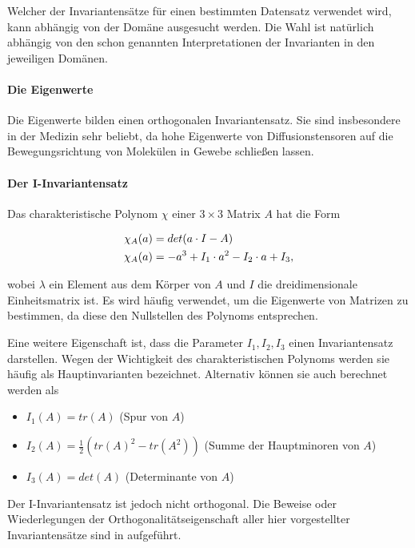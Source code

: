 \documentclass[a4paper,fontsize=12pt,toc=bib,parskip=half,ngerman]{scrartcl}
\begin{document}
Welcher der Invariantens\"atze f\"ur einen bestimmten Datensatz verwendet wird, kann abh\"angig von der Dom\"ane ausgesucht werden. Die Wahl ist nat\"urlich abh\"angig von den schon genannten Interpretationen der Invarianten in den jeweiligen Dom\"anen.

\paragraph{Die Eigenwerte}

Die Eigenwerte bilden einen orthogonalen Invariantensatz. Sie sind insbesondere in der Medizin sehr beliebt, da hohe Eigenwerte von Diffusionstensoren auf die Bewegungsrichtung von Molek\"ulen in Gewebe schlie{\ss}en lassen.

\paragraph{Der I-Invariantensatz}
Das charakteristische Polynom $\chi$ einer $3\times3$ Matrix $A$ hat die Form

\begin{equation}
	\centering
	\begin{split}
	&\chi_A(a) = det(a \cdot I - A)\\
	&\chi_A(a) = -a^3 + I_1\cdot a^2 - I_2\cdot a + I_3,
	\end{split}
\end{equation}

wobei $\lambda$ ein Element aus dem K\"orper von $A$ und $I$ die dreidimensionale Einheitsmatrix ist. Es wird h\"aufig verwendet, um die Eigenwerte von Matrizen zu bestimmen, da diese den Nullstellen des Polynoms entsprechen.

Eine weitere Eigenschaft ist, dass die Parameter $I_1, I_2, I_3$ einen Invariantensatz darstellen. Wegen der Wichtigkeit des charakteristischen Polynoms werden sie h\"aufig als \glq Hauptinvarianten\grq{} bezeichnet. Alternativ k\"onnen sie auch berechnet werden als

\begin{itemize}
	\item $I_1(A) = tr(A)$ (Spur von $A$)
	\item $I_2(A) = \frac{1}{2}(tr(A)^2 - tr(A^2))$ (Summe der Hauptminoren von $A$)
	\item $I_3(A) = det(A)$ (Determinante von $A$)
\end{itemize}

Der I-Invariantensatz ist jedoch nicht orthogonal. Die Beweise oder Wiederlegungen der Orthogonalit\"atseigenschaft aller hier vorgestellter Invariantens\"atze sind in \cite[S.~144]{ennis2006orthogonal} aufgef\"uhrt.
\end{document}
